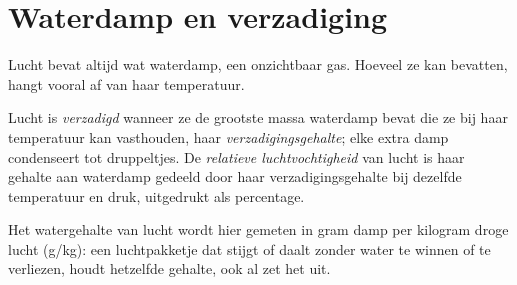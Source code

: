 \section{Waterdamp en verzadiging}

Lucht bevat altijd wat waterdamp, een onzichtbaar gas. Hoeveel ze kan bevatten,
hangt vooral af van haar temperatuur.

\begin{definition}\label{def:g10:why-clouds-form:humidity}
Lucht is \emph{verzadigd} wanneer ze de grootste massa
waterdamp bevat die ze bij haar temperatuur kan vasthouden, haar
\emph{verzadigingsgehalte}; elke extra damp condenseert tot druppeltjes. De
\emph{relatieve luchtvochtigheid} van lucht
is haar gehalte aan waterdamp gedeeld door haar verzadigingsgehalte bij dezelfde
temperatuur en druk, uitgedrukt als percentage.
\end{definition}

Het watergehalte van lucht wordt hier gemeten in gram damp per kilogram droge
lucht (\unit{g/kg}): een luchtpakketje dat stijgt of daalt zonder water te
winnen of te verliezen, houdt hetzelfde gehalte, ook al zet het uit.

